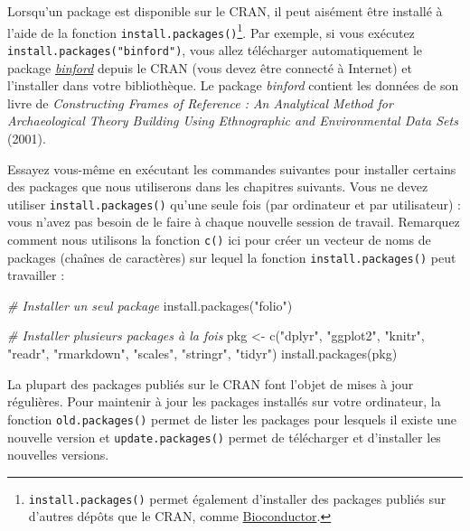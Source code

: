 \documentclass[
  french,
]{scrbook}
\newenvironment{Shaded}{\begin{snugshade}}{\end{snugshade}}
\newcommand{\CommentTok}[1]{\textcolor[rgb]{0.56,0.35,0.01}{\textit{#1}}}
\newcommand{\FunctionTok}[1]{\textcolor[rgb]{0.00,0.00,0.00}{#1}}
\newcommand{\NormalTok}[1]{#1}
\newcommand{\OtherTok}[1]{\textcolor[rgb]{0.56,0.35,0.01}{#1}}
\newcommand{\StringTok}[1]{\textcolor[rgb]{0.31,0.60,0.02}{#1}}
\begin{document}
Lorsqu'un package est disponible sur le CRAN, il peut aisément être installé à l'aide de la fonction \texttt{install.packages()}\footnote{\texttt{install.packages()} permet également d'installer des packages publiés sur d'autres dépôts que le CRAN, comme \href{https://www.bioconductor.org/}{Bioconductor}.}. Par exemple, si vous exécutez \texttt{install.packages("binford")}, vous allez télécharger automatiquement le package \href{https://cran.r-project.org/package=binford}{\emph{binford}} depuis le CRAN (vous devez être connecté à Internet) et l'installer dans votre bibliothèque. Le package \emph{binford} contient les données de son livre de \emph{Constructing Frames of Reference : An Analytical Method for Archaeological Theory Building Using Ethnographic and Environmental Data Sets} (2001).

Essayez vous-même en exécutant les commandes suivantes pour installer certains des packages que nous utiliserons dans les chapitres suivants. Vous ne devez utiliser \texttt{install.packages()} qu'une seule fois (par ordinateur et par utilisateur) : vous n'avez pas besoin de le faire à chaque nouvelle session de travail. Remarquez comment nous utilisons la fonction \texttt{c()} ici pour créer un vecteur de noms de packages (chaînes de caractères) sur lequel la fonction \texttt{install.packages()} peut travailler :

\begin{Shaded}
\begin{Highlighting}[]
\CommentTok{\# Installer un seul package}
\FunctionTok{install.packages}\NormalTok{(}\StringTok{"folio"}\NormalTok{)}

\CommentTok{\# Installer plusieurs packages à la fois}
\NormalTok{pkg }\OtherTok{\textless{}{-}} \FunctionTok{c}\NormalTok{(}\StringTok{"dplyr"}\NormalTok{, }\StringTok{"ggplot2"}\NormalTok{, }\StringTok{"knitr"}\NormalTok{, }\StringTok{"readr"}\NormalTok{, }\StringTok{"rmarkdown"}\NormalTok{, }\StringTok{"scales"}\NormalTok{, }\StringTok{"stringr"}\NormalTok{, }\StringTok{"tidyr"}\NormalTok{)}
\FunctionTok{install.packages}\NormalTok{(pkg)}
\end{Highlighting}
\end{Shaded}

\begin{tcolorbox}[fonttitle=\sffamily\bfseries\large,title=Conseil,colframe=darkcyan]

La plupart des packages publiés sur le CRAN font l'objet de mises à jour régulières. Pour maintenir à jour les packages installés sur votre ordinateur, la fonction \texttt{old.packages()} permet de lister les packages pour lesquels il existe une nouvelle version et \texttt{update.packages()} permet de télécharger et d'installer les nouvelles versions.

\end{tcolorbox}
\end{document}
